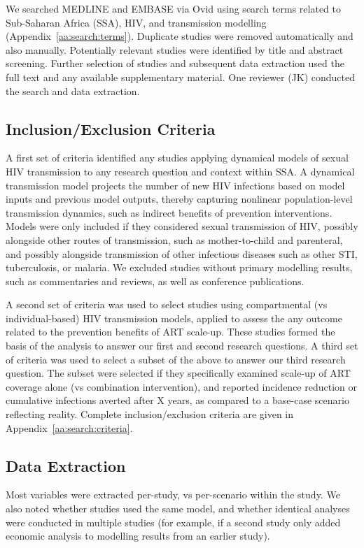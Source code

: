 We searched MEDLINE and EMBASE via Ovid
using search terms related to Sub-Saharan Africa (SSA), HIV, and transmission modelling
(Appendix~\ref{aa:search:terms}).
Duplicate studies were removed automatically and also manually.
Potentially relevant studies were identified by title and abstract screening.
Further selection of studies and subsequent data extraction used
the full text and any available supplementary material.
One reviewer (JK) conducted the search and data extraction.
\subsection{Inclusion/Exclusion Criteria}
\label{ss:meth:criteria}
A first set of criteria identified any studies applying
dynamical models of sexual HIV transmission
to any research question and context within SSA.
A dynamical transmission model projects the number of new HIV infections
based on model inputs and previous model outputs,
thereby capturing nonlinear population-level transmission dynamics,
such as indirect benefits of prevention interventions.
Models were only included if they considered sexual transmission of HIV,
possibly alongside other routes of transmission,
such as mother-to-child and parenteral,
and possibly alongside transmission of other infectious diseases
such as other STI, tuberculosis, or malaria.
We excluded studies without primary modelling results,
such as commentaries and reviews, as well as conference publications.
\par
A second set of criteria was used to select studies using
compartmental (vs individual-based) HIV transmission models,
applied to assess the any outcome related to
the prevention benefits of ART scale-up.
These studies formed the basis of the analysis to answer
our first and second research questions.
A third set of criteria was used to select a subset of the above
to answer our third research question.
The subset were selected if they specifically examined
scale-up of ART coverage alone (vs combination intervention),
and reported incidence reduction or cumulative infections averted after X years,
as compared to a base-case scenario reflecting reality.
Complete inclusion/exclusion criteria are given in
Appendix~\ref{aa:search:criteria}.
\subsection{Data Extraction}
\label{ss:meth:data}
Most variables were extracted per-study,
vs per-scenario within the study.
We also noted whether studies used the same model,
and whether identical analyses were conducted in multiple studies
(for example, if a second study only added economic analysis to
modelling results from an earlier study).
